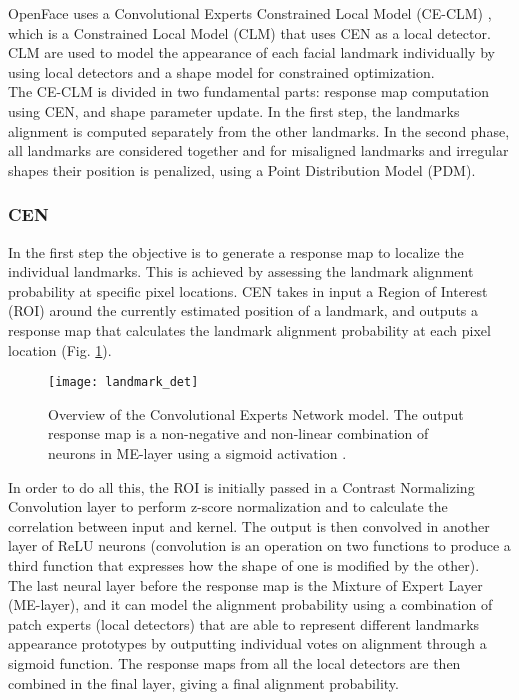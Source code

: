 OpenFace uses a Convolutional Experts Constrained Local Model (CE-CLM) \cite{Baltru2017}, which is a Constrained Local Model (CLM) that uses CEN as a local detector. CLM are used to model the appearance of each facial landmark individually by using local detectors and a shape model for constrained optimization.\\
The CE-CLM is divided in two fundamental parts: response map computation using CEN, and shape parameter update. In the first step, the landmarks alignment is computed separately from the other landmarks. In the second phase, all landmarks are considered together and for misaligned landmarks and irregular shapes their position is penalized, using a Point Distribution Model (PDM).\\

\subsubsection{CEN}
In the first step the objective is to generate a response map to localize the individual landmarks. This is achieved by assessing the landmark alignment probability at specific pixel locations. CEN takes in input a Region of Interest (ROI) around the currently estimated position of a landmark, and outputs a response map that calculates the landmark alignment probability at each pixel location (Fig. \ref{fig:landmark_det}). \\
\begin{figure}[H]
	\centering
	\texttt{[image: landmark\_det]}
	\caption{Overview of the Convolutional Experts Network model. The output response map is a non-negative and non-linear combination of neurons in ME-layer using a sigmoid activation \cite{Baltru2017}.}
	\label{fig:landmark_det}
\end{figure}
In order to do all this, the ROI is initially passed in a Contrast Normalizing Convolution layer to perform z-score normalization and to calculate the correlation between input and kernel. The output is then convolved in another layer of ReLU neurons (convolution is an operation on two functions to produce a third function that expresses how the shape of one is modified by the other). \\
The last neural layer before the response map is the Mixture of Expert Layer (ME-layer), and it can model the alignment probability using a combination of patch experts (local detectors) that are able to represent different landmarks appearance prototypes by outputting individual votes on alignment through a sigmoid function. The response maps from all the local detectors are then combined in the final layer, giving a final alignment probability.

